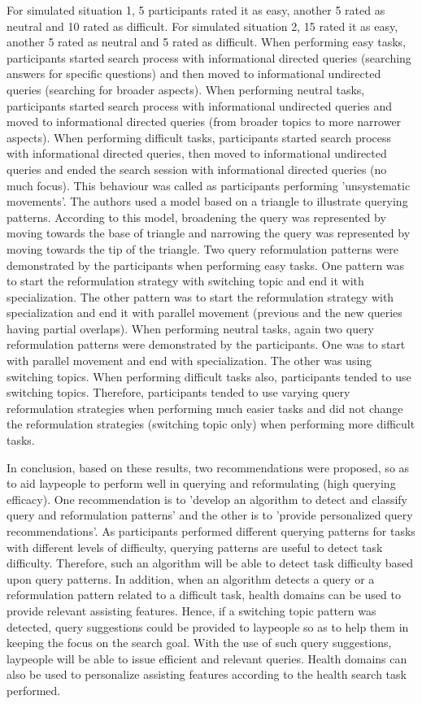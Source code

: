 \documentclass[]{article}
\begin{document}
For simulated situation 1, 5 participants rated it as easy, another 5 rated as neutral and 10 rated as difficult. For simulated situation 2, 15 rated it as easy, another 5 rated as neutral and 5 rated as difficult. When performing easy tasks, participants started search process with informational directed queries (searching answers for specific questions) and then moved to informational undirected queries (searching for broader aspects). When performing neutral tasks, participants started search process with informational undirected queries and moved to informational directed queries (from broader topics to more narrower aspects). When performing difficult tasks, participants started search process with informational directed queries, then moved to informational undirected queries and ended the search session with informational directed queries (no much focus). This behaviour was called as participants performing 'unsystematic movements'. The authors used a model based on a triangle to illustrate querying patterns. According to this model, broadening the query was represented by moving towards the base of triangle and narrowing the query was represented by moving towards the tip of the triangle. Two query reformulation patterns were demonstrated by the participants when performing easy tasks. One pattern was to start the reformulation strategy with switching topic and end it with specialization. The other pattern was to start the reformulation strategy with specialization and end it with parallel movement (previous and the new queries having partial overlaps). When performing neutral tasks, again two query reformulation patterns were demonstrated by the participants. One was to start with parallel movement and end with specialization. The other was using switching topics. When performing difficult tasks also, participants tended to use switching topics. Therefore, participants tended to use varying query reformulation strategies when performing much easier tasks and did not change the reformulation strategies (switching topic only) when performing more difficult tasks. 

In conclusion, based on these results, two recommendations were proposed, so as to aid laypeople to perform well in querying and reformulating (high querying efficacy). One recommendation is to 'develop an algorithm to detect and classify query and reformulation patterns' and the other is to 'provide personalized query recommendations'. As participants performed different querying patterns for tasks with different levels of difficulty, querying patterns are useful to detect task difficulty. Therefore, such an algorithm will be able to detect task difficulty based upon query patterns. In addition, when an algorithm detects a query or a reformulation pattern related to a difficult task, health domains can be used to provide relevant assisting features. Hence, if a switching topic pattern was detected, query suggestions could be provided to laypeople so as to help them in keeping the focus on the search goal. With the use of such query suggestions, laypeople will be able to issue efficient and relevant queries. Health domains can also be used to personalize assisting features according to the health search task performed.      
 
\end{document}
